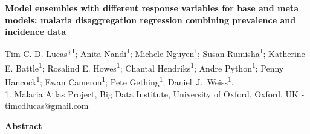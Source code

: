 \documentclass[11pt]{article}
\begin{document}



\small{

\begin{center}
\textbf{Model ensembles with different response variables for base and meta models: malaria disaggregation regression combining prevalence and incidence data}
\end{center}



\begin{center}
{Tim C. D. Lucas*\textsuperscript{1}; Anita Nandi\textsuperscript{1}; Michele Nguyen\textsuperscript{1}; 
Susan Rumisha\textsuperscript{1}; 
Katherine E. Battle\textsuperscript{1}; Rosalind E. Howes\textsuperscript{1}; 
Chantal Hendriks\textsuperscript{1}; Andre Python\textsuperscript{1}; Penny Hancock\textsuperscript{1}; 
Ewan Cameron\textsuperscript{1}; Pete Gething\textsuperscript{1}; Daniel~J.~Weiss\textsuperscript{1}.}\\
{1. Malaria Atlas Project, Big Data Institute, University of Oxford, Oxford, UK - timcdlucas@gmail.com}\\ 


\end{center}

\begin{center}
{\bf Abstract}
\end{center}

\setlength{\parindent}{0pt}


}
\end{document}
